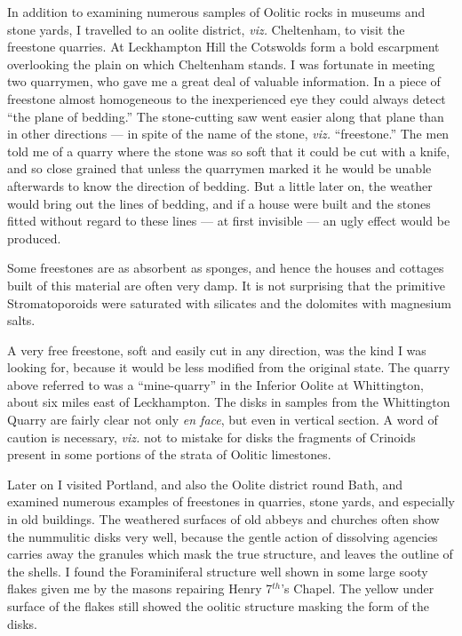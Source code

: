 \documentclass[a4paper, 12pt, oneside]{article}
\begin{document}
In addition to examining numerous samples of Oolitic rocks in museums and stone yards, I travelled to an oolite district, \emph{viz.} Cheltenham, to visit the freestone quarries. At Leckhampton Hill the Cotswolds form a bold escarpment overlooking the plain on which Cheltenham stands. I was fortunate in meeting two quarrymen, who gave me a great deal of valuable information. In a piece of freestone almost homogeneous to the inexperienced eye they could always detect ``the plane of bedding.'' The stone-cutting saw went easier along that plane than in other directions --- in spite of the name of the stone, \emph{viz.} ``freestone.'' The men told me of a quarry where the stone was so soft that it could be cut with a knife, and so close grained that unless the quarrymen marked it he would be unable afterwards to know the direction of bedding. But a little later on, the weather would bring out the lines of bedding, and if a house were built and the stones fitted without regard to these lines --- at first invisible --- an ugly effect would be produced.

Some freestones are as absorbent as sponges, and hence the houses and cottages built of this material are often very damp. It is not surprising that the primitive Stromatoporoids were saturated with silicates and the dolomites with magnesium salts.

A very free freestone, soft and easily cut in any direction, was the kind I was looking for, because it would be less modified from the original state. The quarry above referred to was a ``mine-quarry'' in the Inferior Oolite at Whittington, about six miles east of Leckhampton. The disks in samples from the Whittington Quarry are fairly clear not only \emph{en face}, but even in vertical section. A word of caution is necessary, \emph{viz.} not to mistake for disks the fragments of Crinoids present in some portions of the strata of Oolitic limestones.

Later on I visited Portland, and also the Oolite district round Bath, and examined numerous examples of freestones in quarries, stone yards, and especially in old buildings. The weathered surfaces of old abbeys and churches often show the nummulitic disks very well, because the gentle action of dissolving agencies carries away the granules which mask the true structure, and leaves the outline of the shells. I found the Foraminiferal structure well shown in some large sooty flakes given me by the masons repairing Henry 7$^{th}$'s Chapel. The yellow under surface of the flakes still showed the oolitic structure masking the form of the disks.
\end{document}
